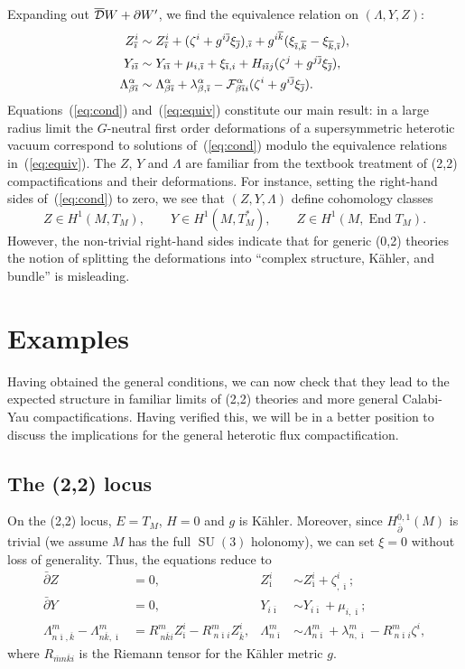 \documentclass[11pt, a4paper]{article}
\def\cDb{{\overline{\cD}}}
\def\End{\operatorname{End}}
\def\SU{\operatorname{SU}}
\def\p{\partial}
\def\pb{\bar{\partial}}
\def\cD{{\cal D}}
\def\cF{{\cal F}}
\newcommand\ib{\overline{\imath}}
\newcommand\jb{\overline{\jmath}}
\newcommand\kb{\overline{k}}
\newcommand\mb{\overline{m}}
\def\cDb{\overline{\cD}}
\begin{document}
Expanding out $\cDb W + \p W'$, we find the equivalence relation on $(\Lambda,Y,Z)$:
\begin{align}
\label{eq:equiv}
Z^i_{\ib} & \sim Z^i_{\ib} + (\zeta^i+g^{i\jb} \xi_{\jb})_{,\ib} +g^{i\kb}(\xi_{\ib,\kb}-\xi_{\kb,\ib}), \nonumber\\
Y_{i\ib} &\sim Y_{i\ib} +\mu_{i,\ib} + \xi_{\ib,i} + H_{ i\ib j}(\zeta^j+g^{j\jb} \xi_{\jb}) , \\
\Lambda^\alpha_{\beta\ib} & \sim
\Lambda^\alpha_{\beta\ib} +
\lambda^\alpha_{\beta,\ib} - \cF^\alpha_{\beta\ib i} (\zeta^i + g^{i\jb} \xi_{\jb}). \nonumber
\end{align}
Equations~(\ref{eq:cond}) and~(\ref{eq:equiv}) constitute our main result:  in a large radius limit the $G$-neutral first order deformations of a supersymmetric heterotic vacuum correspond to solutions of~(\ref{eq:cond}) modulo the equivalence relations in~(\ref{eq:equiv}).
The $Z$, $Y$ and $\Lambda$ are familiar from the textbook treatment of (2,2) compactifications and their deformations.  For instance, setting the right-hand sides of~(\ref{eq:cond}) to zero, we see that
$(Z,Y,\Lambda)$ define cohomology classes
$$ Z \in H^1(M, T_M), \qquad Y \in H^1( M,T^\ast_M), \qquad Z \in H^1(M,\End T_M).$$
However, the non-trivial right-hand sides indicate that for generic (0,2) theories the notion of splitting the deformations into ``complex structure, K\"ahler, and bundle'' is misleading.

\section{Examples} \label{s:examples}
Having obtained the general conditions, we can now check that they lead to the expected structure in
familiar limits of (2,2) theories and more general Calabi-Yau compactifications.  Having verified this, we
will be in a better position to discuss the implications for the general heterotic flux compactification.

\subsection{The (2,2) locus}

On the (2,2) locus, $E = T_M$, $H=0$ and $g$ is K\"ahler.   Moreover, since $H^{0,1}_{\pb} (M)$ is
trivial (we assume $M$ has the full $\SU(3)$ holonomy), we can set $\xi = 0$ without loss of generality.   
Thus, the equations reduce to
\begin{align}
\label{eq:22}
\pb Z & = 0, &   Z^i_{\ib} & \sim Z^i_{\ib} + \zeta^i_{,\ib}; \nonumber\\
\pb Y & = 0, &  Y_{i\ib} & \sim Y_{i\ib} + \mu_{i,\ib} ; \nonumber\\
\Lambda^m_{n\ib,\kb}  -
\Lambda^m_{n\kb,\ib} & = 
R^m_{~n\kb i} Z^i_{\ib} -R^m_{~n\ib i} Z^i_{\kb}, &
\Lambda^m_{n\ib} &\sim
\Lambda^m_{n\ib} + \lambda^m_{n,\ib} - R^m_{~n\ib i} \zeta^i,
\end{align}
where $R_{\mb n \kb i}$ is the Riemann tensor for the K\"ahler metric $g$.
\end{document}
